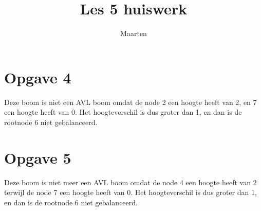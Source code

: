 \documentclass[12pt,a4paper]{article}
\title{Les 5 huiswerk}
\author{Maarten}
\begin{document}
\maketitle

\section{Opgave 4}
Deze boom is niet een AVL boom omdat de node 2 een hoogte heeft van 2, en 7 een hoogte heeft van 0.
Het hoogteverschil is dus groter dan 1, en dan is de rootnode 6 niet gebalanceerd.

\section{Opgave 5}
Deze boom is niet meer een AVL boom omdat de node 4 een hoogte heeft van 2 terwijl de node 7 een hoogte heeft van 0.
Het hoogteverschil is dus groter dan 1, en dan is de rootnode 6 niet gebalanceerd.
\end{document}
